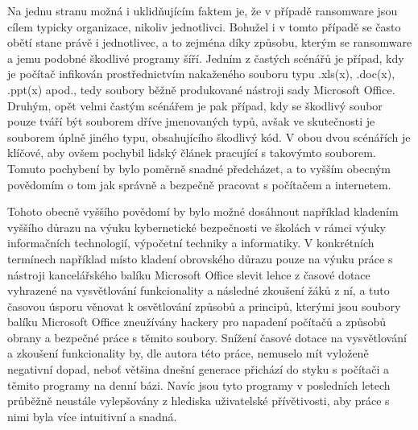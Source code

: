\documentclass[a4paper, 12pt]{article}
\begin{document}
Na jednu stranu možná i uklidňujícím faktem je, že v případě ransomware jsou cílem typicky organizace, nikoliv jednotlivci. Bohužel i v tomto případě se často obětí stane právě i jednotlivec, a to zejména díky způsobu, kterým se ransomware a jemu podobné škodlivé programy šíří. Jedním z častých scénářů je případ, kdy je počítač infikován prostřednictvím nakaženého souboru typu .xls(x), .doc(x), .ppt(x) apod., tedy soubory běžně produkované nástroji sady Microsoft Office. Druhým, opět velmi častým scénářem je pak případ, kdy se škodlivý soubor pouze tváří být souborem dříve jmenovaných typů, avšak ve skutečnosti je souborem úplně jiného typu, obsahujícího škodlivý kód. V obou dvou scénářích je klíčové, aby ovšem pochybil lidský článek pracující s takovýmto souborem. Tomuto pochybení by bylo poměrně snadné předcházet, a to vyšším obecným povědomím o tom jak správně a bezpečně pracovat s počítačem a internetem. 

Tohoto obecně vyššího povědomí by bylo možné dosáhnout například kladením vyššího důrazu na výuku kybernetické bezpečnosti ve školách v rámci výuky informačních technologií, výpočetní techniky a informatiky. V konkrétních termínech například místo kladení obrovského důrazu pouze na výuku práce s nástroji kancelářského balíku Microsoft Office slevit lehce z časové dotace vyhrazené na vysvětlování funkcionality a následné zkoušení žáků z ní, a tuto časovou úsporu věnovat k osvětlování způsobů a principů, kterými jsou soubory balíku Microsoft Office zneužívány hackery pro napadení počítačů a způsobů obrany a bezpečné práce s těmito soubory. Snížení časové dotace na vysvětlování a zkoušení funkcionality by, dle autora této práce, nemuselo mít vyloženě negativní dopad, neboť většina dnešní generace přichází do styku s počítači a těmito programy na denní bázi. Navíc jsou tyto programy v posledních letech průběžně neustále vylepšovány z hlediska uživatelské přívětivosti, aby práce s nimi byla více intuitivní a snadná. 
\end{document}

